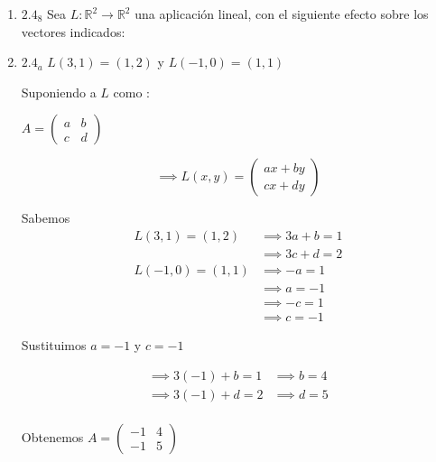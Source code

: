 \documentclass{article}
\begin{document}
		\begin{enumerate}
			
			
			\item[] \(2.4_8\) Sea \(L:\mathbb{R}^2 \to \mathbb{R}^2\) una aplicación lineal, con el siguiente efecto sobre los vectores indicados:
			
			
			\item \(2.4_a\) \(L(3,1)=(1,2)\) y \(L(-1,0)=(1,1)\)
			
			Suponiendo a \(L\) como : 
			
			\(
			A=
			\begin{pmatrix}
					a & b \\
					c & d
			\end{pmatrix}
			\)
			
			\begin{equation*}
				\implies L(x,y)=
				\begin{pmatrix}
					ax + by\\
					cx + dy
				\end{pmatrix}
			\end{equation*}
			
			Sabemos
			\begin{equation*}
				\begin{aligned}
					L(3,1)=(1,2) &\implies 3a+b=1 \\
						          &\implies 3c+d=2 \\
					L(-1,0) =(1,1) &\implies -a=1 \\
									&\implies a=-1 \\
									&\implies -c=1 \\
									&\implies c=-1 
				\end{aligned}
			\end{equation*}
			
			Sustituimos \(a=-1\) y \(c=-1\)
			
			\begin{equation*}
				\begin{aligned}
					\implies 3(-1)+b=1 &\implies b=4 \\
					\implies 3(-1)+d=2 &\implies d=5 \\
				\end{aligned}
			\end{equation*}
			
			Obtenemos
			\(
			A=
			\begin{pmatrix}
				-1 & 4 \\
				-1 & 5
			\end{pmatrix}
			\)
			

\end{enumerate}
\end{document}
